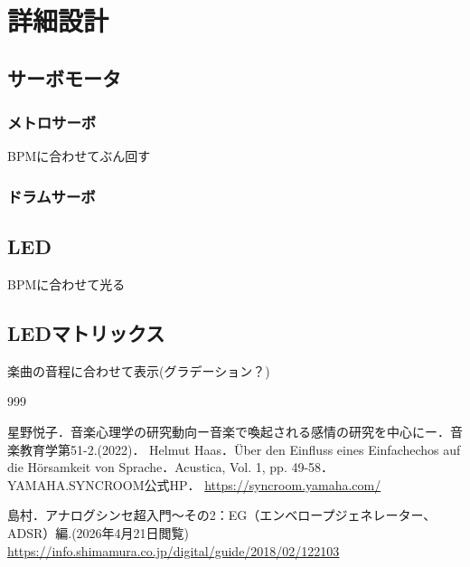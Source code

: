 \documentclass[uplatex,dvipdfmx]{jlreq}
\begin{document}
\section{詳細設計}

\subsection{サーボモータ}
    \subsubsection{メトロサーボ}
    BPMに合わせてぶん回す

    \subsubsection{ドラムサーボ}

    \subsection{LED}
    BPMに合わせて光る

    \subsection{LEDマトリックス}
    楽曲の音程に合わせて表示(グラデーション？)

















\begin{thebibliography}{999}

星野悦子．音楽心理学の研究動向ー音楽で喚起される感情の研究を中心にー．音楽教育学第51-2.(2022)．
Helmut Haas．Über den Einfluss eines Einfachechos auf die Hörsamkeit von Sprache．Acustica, Vol. 1, pp. 49-58．
YAMAHA.SYNCROOM公式HP．
\small\url{https://syncroom.yamaha.com/}

島村．アナログシンセ超入門～その2：EG（エンベロープジェネレーター、ADSR）編.(2026年4月21日閲覧)
\small\url{https://info.shimamura.co.jp/digital/guide/2018/02/122103}

\end{thebibliography}
\end{document}
